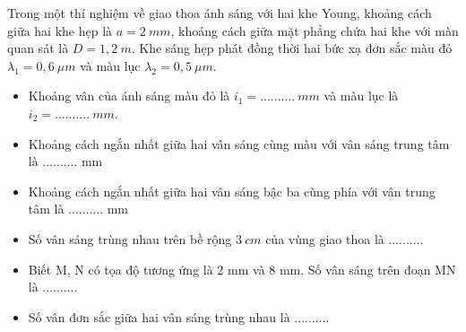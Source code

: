 \begin{vidu}%
Trong một thí nghiệm về giao thoa ánh sáng với hai khe Young, khoảng cách giữa hai khe hẹp là $a=2\ mm$, khoảng cách giữa mặt phẳng chứa hai khe với màn quan sát là $D=1,2\ m$. Khe sáng hẹp phát đồng thời hai bức xạ đơn sắc màu đỏ $\lambda_1=0,6\ \mu m$ và màu lục $\lambda_2=0,5\ \mu m$.
\begin{itemize}
\item[1.] Khoảng vân của ánh sáng màu đỏ là $i_1=..........\ mm$ và màu lục là $i_2=..........\ mm$. 
\item[2.] Khoảng cách ngắn nhất giữa hai vân sáng cùng màu với vân sáng trung tâm là .......... mm
\item[3.] Khoảng cách ngắn nhất giữa hai vân sáng bậc ba cùng phía với vân trung tâm là .......... mm
\item[4.] Số vân sáng trùng nhau trên bề rộng $3\ cm$ của vùng giao thoa là ..........
\item[5.] Biết M, N có tọa độ tương ứng là 2 mm và 8 mm. Số vân sáng trên đoạn MN là ..........
\item [6.] Số vân đơn sắc giữa hai vân sáng trùng nhau  là ..........
\end{itemize}
\end{vidu} %


